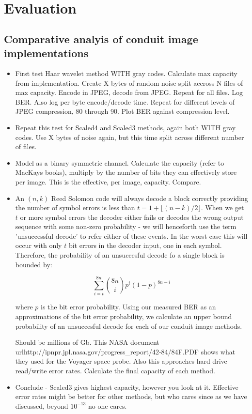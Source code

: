 \chapter{Evaluation}\label{ch:evaluation}

\section{Comparative analyis of conduit image implementations}

\begin{itemize}
\item First test Haar wavelet method WITH gray codes. Calculate max capacity from implementation. Create X bytes of random noise split accross N files of max capacity. Encode in JPEG, decode from JPEG. Repeat for all files. Log BER. Also log per byte encode/decode time. Repeat for different levels of JPEG compression, 80 through 90. Plot BER against compression level.

\item Repeat this test for Scaled4 and Scaled3 methods, again both WITH gray codes. Use X bytes of noise again, but this time split across different number of files.

\item Model as a binary symmetric channel. Calculate the capacity (refer to MacKays books), multiply by the number of bits they can effectively store per image. This is the effective, per image, capacity. Compare.

\item An $(n,k)$ Reed Solomon code will always decode a block correctly providing the number of symbol errors is less than $t = 1 + \lfloor (n-k)/2  \rfloor$. When we get $t$ or more symbol errors the decoder either fails or decodes the wrong output sequence with some non-zero probability - we will henceforth use the term 'unsuccessful decode' to refer either of these events. In the worst case this will occur with only $t$ bit errors in the decoder input, one in each symbol. Therefore, the probability of an unsuccesful decode fo a single block is bounded by:

\begin{equation}
    \sum_{i=t}^{8n} {{8n}\choose{i}} p^i (1-p)^{8n-i}
\end{equation}

where $p$ is the bit error probability. Using our measured BER as an approximations of the bit error probability, we calculate an upper bound probability of an unsuccesful decode for each of our conduit image methods.

Should be millions of Gb. This NASA document url{http://ipnpr.jpl.nasa.gov/progress\_report/42-84/84F.PDF} shows what they used for the Voyager space probe. Also this approaches hard drive read/write error rates. Calculate the final capacity of each method.

\item Conclude - Scaled3 gives highest capacity, however you look at it. Effective error rates might be better for other methods, but who cares since as we have discussed, beyond $10^{-13}$ no one cares.
\end{itemize} 


